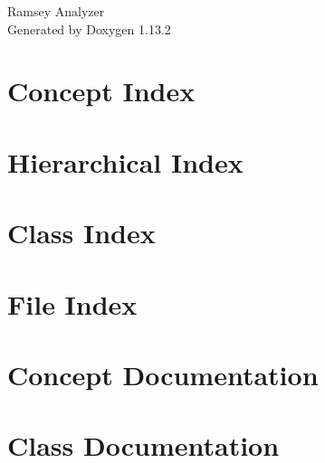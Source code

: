 \documentclass[twoside]{book}
\newcommand{\+}{\discretionary{\mbox{\scriptsize$\hookleftarrow$}}{}{}}
\newcommand{\clearemptydoublepage}{%
    \newpage{\pagestyle{empty}\cleardoublepage}%
  }
\begin{document}
  \raggedbottom
    \hypersetup{pageanchor=false,
                bookmarksnumbered=true,
                pdfencoding=unicode
               }
  \begin{titlepage}
  \vspace*{7cm}
  \begin{center}%
  {\Large Ramsey Analyzer}\\
  \vspace*{1cm}
  {\large Generated by Doxygen 1.13.2}\\
  \end{center}
  \end{titlepage}
  \clearemptydoublepage
  \tableofcontents
  \clearemptydoublepage
  \hypersetup{pageanchor=true}
\chapter{Concept Index}

\chapter{Hierarchical Index}

\chapter{Class Index}

\chapter{File Index}

\chapter{Concept Documentation}


\chapter{Class Documentation}




















\end{document}
